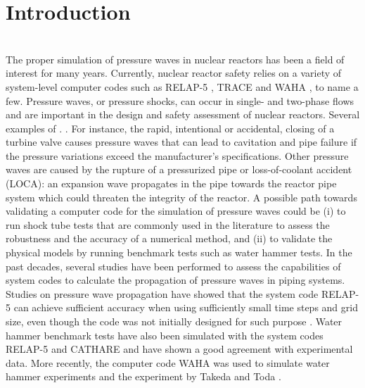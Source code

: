 \documentclass{inputs/mc2015}
\begin{document}
\section{Introduction}\label{sec:intro}
%
%
 \\
The proper simulation of pressure waves in nuclear reactors has been a field of interest for many years. Currently, nuclear reactor safety relies on a variety of system-level computer codes such as RELAP-5 \cite{relap5}, TRACE \cite{trace} and WAHA \cite{waha-manual}, to name a few. Pressure waves, or pressure shocks, can occur in single- and two-phase flows and are important in the design and safety assessment of nuclear reactors. Several examples of . . For instance, the rapid, intentional or accidental, closing of a turbine valve causes pressure waves that can lead to cavitation and pipe failure if the pressure variations exceed the manufacturer's specifications. Other pressure waves are caused by the rupture of a pressurized pipe or loss-of-coolant accident (LOCA): an expansion wave propagates in the pipe towards the reactor pipe  system which could threaten the integrity of the reactor. A possible path towards validating a computer code for the simulation of pressure waves could be (i) to run shock tube tests that are commonly used in the literature to assess the robustness and the accuracy of a numerical method, and (ii) to validate the physical models by running benchmark tests such as water hammer tests. In the past decades, several studies have been performed to assess the capabilities of system codes to calculate the propagation of pressure waves in piping systems. Studies on pressure wave propagation have showed that the system code RELAP-5 can achieve sufficient accuracy when using sufficiently small time steps and grid size, even though the code was not initially designed for such purpose \cite{tiselji-gale}. Water hammer benchmark tests have also been simulated with the system codes RELAP-5 \cite{Serre-bestion, bestion-serre-2012, Sokolowski-Koszela} and CATHARE \cite{cathare} and have shown a good agreement with experimental data. More recently, the computer code WAHA was used to simulate water hammer experiments \cite{waha} and the experiment by Takeda and Toda \cite{costa-tiselji}. 
\end{document}

